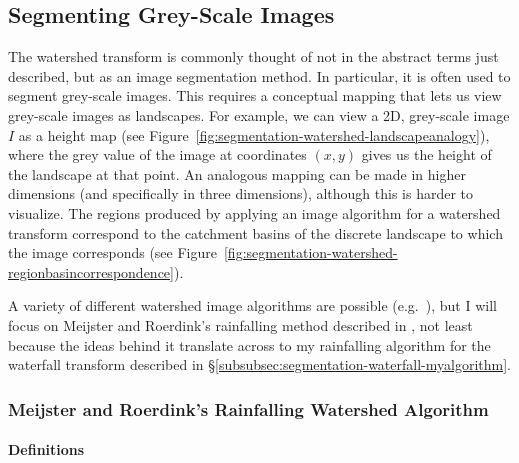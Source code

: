 \subsection{Segmenting Grey-Scale Images}
\label{subsec:segmentation-watershed-greyscale}

The watershed transform is commonly thought of not in the abstract terms just described, but as an image segmentation method. In particular, it is often used to segment grey-scale images. This requires a conceptual mapping that lets us view grey-scale images as landscapes. For example, we can view a 2D, grey-scale image $I$ as a height map (see Figure~\ref{fig:segmentation-watershed-landscapeanalogy}), where the grey value of the image at coordinates $(x,y)$ gives us the height of the landscape at that point. An analogous mapping can be made in higher dimensions (and specifically in three dimensions), although this is harder to visualize. The regions produced by applying an image algorithm for a watershed transform correspond to the catchment basins of the discrete landscape to which the image corresponds (see Figure~\ref{fig:segmentation-watershed-regionbasincorrespondence}).



A variety of different watershed image algorithms are possible (e.g.~\cite{bieniek00,meijster98,osma-ruiz06,rambabu07,stoev00}), but I will focus on Meijster and Roerdink's rainfalling method described in \cite{meijster98}, not least because the ideas behind it translate across to my rainfalling algorithm for the waterfall transform described in \S\ref{subsubsec:segmentation-waterfall-myalgorithm}.

\subsubsection{Meijster and Roerdink's Rainfalling Watershed Algorithm}

\paragraph{Definitions}

